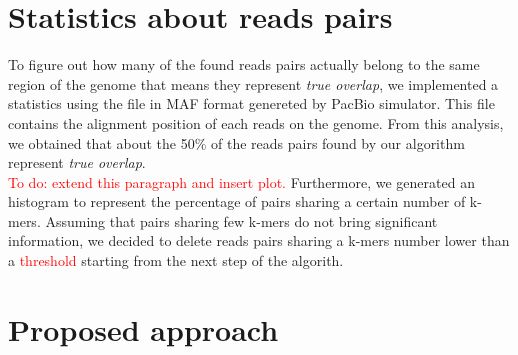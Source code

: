 \documentclass[11pt]{article}
\newcommand\myworries[1]{\textcolor{red}{#1}}
\begin{document}

\section{Statistics about reads pairs}\label{pairs}

To figure out how many of the found reads pairs actually belong to the same region of the genome that means they represent \emph{true overlap}, we implemented a statistics using the file in MAF format genereted by PacBio simulator.
This file contains the alignment position of each reads on the genome.
From this analysis, we obtained that about the 50\% of the reads pairs found by our algorithm represent \emph{true overlap}.\\
\myworries{To do: extend this paragraph and insert plot.}
Furthermore, we generated an histogram to represent the percentage of pairs sharing a certain number of k-mers.
Assuming that pairs sharing few k-mers do not bring significant information, we decided to delete reads pairs sharing a k-mers number lower than a \myworries{threshold} starting from the next step of the algorith.

\section{Proposed approach}\label{approach}
\end{document}
